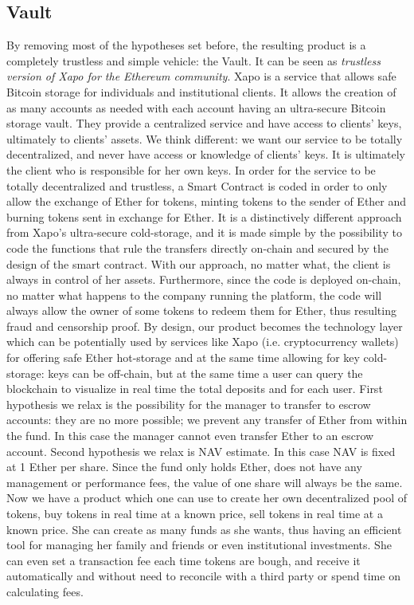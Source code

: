\documentclass[9pt,oneside]{amsart}
\begin{document}
\begin{multicols}{2}
\section{Vault} \label{ch:minimum}
By removing most of the hypotheses set before, the resulting product is a completely trustless and simple vehicle: the Vault. It can be seen as  \textit{trustless version of Xapo for the Ethereum community}. 
Xapo is a service that allows safe Bitcoin storage for individuals and institutional clients. It allows the creation of as many accounts as needed with each account having an ultra-secure Bitcoin storage vault. They provide a centralized service and have access to clients' keys, ultimately to clients' assets.
We think different: we want our service to be totally decentralized, and never have access or knowledge of clients' keys. It is ultimately the client who is responsible for her own keys. In order for the service to be totally decentralized and trustless,  a Smart Contract is coded in order to only allow the exchange of Ether for tokens, minting tokens to the sender of Ether and burning tokens sent in exchange for Ether. It is a distinctively different approach from Xapo's ultra-secure cold-storage, and it is made simple by the possibility to code the functions that rule the transfers directly on-chain and secured by the design of the smart contract. With our approach, no matter what, the client is always in control of her assets. Furthermore, since the code is deployed on-chain, no matter what happens to the company running the platform, the code will always allow the owner of some tokens to redeem them for Ether, thus resulting fraud and censorship proof.
By design, our product becomes the technology layer which can be potentially used by services like Xapo (i.e. cryptocurrency wallets) for offering safe Ether hot-storage and at the same time allowing for key cold-storage: keys can be off-chain, but at the same time a user can query the blockchain to visualize in real time the total deposits and for each user. 
First hypothesis we relax is the possibility for the manager to transfer to escrow accounts: they are no more possible; we prevent any transfer of Ether from within the fund. In this case the manager cannot even transfer Ether to an escrow account.
Second hypothesis we relax is NAV estimate. In this case NAV is fixed at 1 Ether per share. Since the fund only holds Ether, does not have any management or performance fees, the value of one share will always be the same. Now we have a product which one can use to create her own decentralized pool of tokens, buy tokens in real time at a known price, sell tokens in real time at a known price. She can create as many funds as she wants, thus having an efficient tool for managing her family and friends or even institutional investments. She can even set a transaction fee each time tokens are bough, and receive it automatically and without need to reconcile with a third party or spend time on calculating fees. 

\end{multicols}
\end{document}
